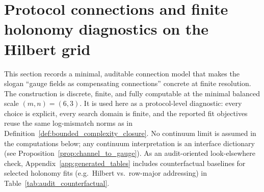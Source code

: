 \section{Protocol connections and finite holonomy diagnostics on the Hilbert grid}
\label{sec:protocol_connections_holonomy}

This section records a minimal, auditable connection model that makes the slogan ``gauge fields as compensating connections'' concrete at finite resolution.
The construction is discrete, finite, and fully computable at the minimal balanced scale $(m,n)=(6,3)$.
It is used here as a protocol-level diagnostic: every choice is explicit, every search domain is finite, and the reported fit objectives reuse the same log-mismatch norms as in Definition~\ref{def:bounded_complexity_closure}.
No continuum limit is assumed in the computations below; any continuum interpretation is an interface dictionary (see Proposition~\ref{prop:channel_to_gauge}).
As an audit-oriented look-elsewhere check, Appendix~\ref{app:generated_tables} includes counterfactual baselines for selected holonomy fits (e.g.\ Hilbert vs.\ row-major addressing) in Table~\ref{tab:audit_counterfactual}.

\begin{center}
\end{center}

